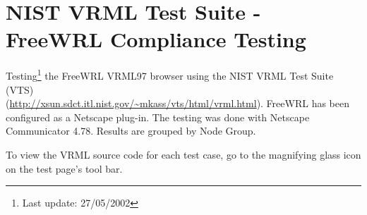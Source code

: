 \documentclass[12pt,letterpaper]{article}
\begin{document}
\part*{NIST VRML Test Suite - FreeWRL Compliance Testing}

Testing\footnote{\textcolor{cranberry}{Last update: 27/05/2002}}
the FreeWRL VRML97 browser using the NIST VRML Test Suite (VTS)\\
(\url{http://xsun.sdct.itl.nist.gov/~mkass/vts/html/vrml.html}).
FreeWRL has been configured as a Netscape plug-in.
The testing was done with Netscape Communicator 4.78.
Results are grouped by Node Group.

To view the VRML source code for each test case, go to the magnifying glass
icon on the test page's tool bar.












\end{document}
